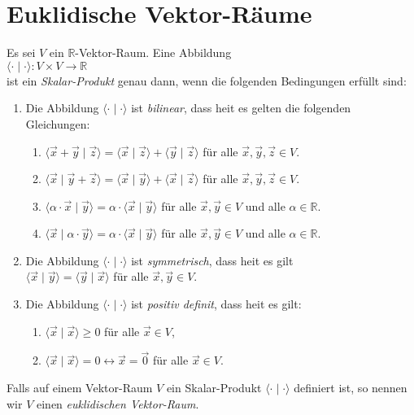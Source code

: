 \section{Euklidische Vektor-R\"{a}ume}
\begin{Definition} \lb
  Es sei $V$ ein $\mathbb{R}$-Vektor-Raum.  Eine Abbildung 
  \\[0.2cm]
  \hspace*{1.3cm}
  $\langle \cdot \mid \cdot \rangle: V \times V \rightarrow \mathbb{R}$
  \\[0.2cm]
  ist ein \emph{Skalar-Produkt} genau dann, wenn die folgenden Bedingungen erf\"{u}llt sind:
  \begin{enumerate}
  \item Die Abbildung $\langle \cdot\mid \cdot \rangle$ ist \emph{bilinear}, dass hei\3t es gelten die
        folgenden Gleichungen:
        \begin{enumerate}
        \item $\langle \vec{x} + \vec{y}\mid \vec{z} \rangle = \langle \vec{x}\mid \vec{z} \rangle + \langle \vec{y}\mid \vec{z} \rangle$
              \quad f\"{u}r alle $\vec{x}, \vec{y}, \vec{z} \in V$.
        \item $\langle \vec{x}\mid \vec{y} + \vec{z} \rangle = \langle \vec{x}\mid \vec{y} \rangle + \langle \vec{x}\mid \vec{z} \rangle$
              \quad f\"{u}r alle $\vec{x}, \vec{y}, \vec{z} \in V$.
        \item $\langle \alpha \cdot \vec{x}\mid \vec{y} \rangle = \alpha \cdot \langle \vec{x}\mid \vec{y} \rangle$
              \quad f\"{u}r alle $\vec{x}, \vec{y} \in V$ und alle $\alpha \in \mathbb{R}$.
        \item $\langle \vec{x}\mid \alpha \cdot \vec{y} \rangle = \alpha \cdot \langle \vec{x}\mid \vec{y} \rangle$
              \quad f\"{u}r alle $\vec{x}, \vec{y} \in V$ und alle $\alpha \in \mathbb{R}$.
        \end{enumerate}
  \item Die Abbildung  $\langle \cdot\mid \cdot \rangle$ ist \emph{symmetrisch}, dass hei\3t es gilt
        \\[0.2cm]
        \hspace*{1.3cm}
        $\langle \vec{x}\mid \vec{y} \rangle = \langle \vec{y}\mid \vec{x} \rangle$ 
        \quad f\"{u}r alle $\vec{x}, \vec{y} \in V$.
  \item Die Abbildung   $\langle \cdot\mid \cdot \rangle$ ist \emph{positiv definit}, dass hei\3t es
        gilt:
        \begin{enumerate}
        \item $\langle \vec{x}\mid \vec{x} \rangle \geq 0$ \quad f\"{u}r alle $\vec{x} \in V$,
        \item $\langle \vec{x}\mid \vec{x} \rangle = 0 \leftrightarrow \vec{x} = \vec{0}$ \quad f\"{u}r alle $\vec{x} \in V$.
        \end{enumerate}
  \end{enumerate} 
  Falls auf einem Vektor-Raum $V$ ein Skalar-Produkt $\langle \cdot \mid \cdot \rangle$ definiert
  ist, so nennen wir $V$ einen \emph{euklidischen Vektor-Raum}.  \eoxs
\end{Definition}

